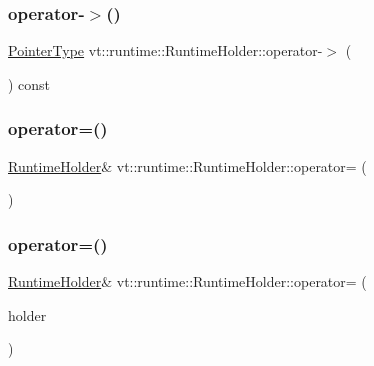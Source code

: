 \subsubsection{\texorpdfstring{operator-\/$>$()}{operator->()}}
{\footnotesize\ttfamily \hyperlink{structvt_1_1runtime_1_1_runtime_holder_a9740e8aa7487fcf38b67a7e160d7b046}{Pointer\+Type} vt\+::runtime\+::\+Runtime\+Holder\+::operator-\/$>$ (\begin{DoxyParamCaption}{ }\end{DoxyParamCaption}) const\hspace{0.3cm}{\ttfamily [inline]}}

\mbox{\label{structvt_1_1runtime_1_1_runtime_holder_a07fbb75fca325419cea85801f7208f22}} 
\subsubsection{\texorpdfstring{operator=()}{operator=()}\hspace{0.1cm}{\footnotesize\ttfamily [1/2]}}
{\footnotesize\ttfamily \hyperlink{structvt_1_1runtime_1_1_runtime_holder}{Runtime\+Holder}\& vt\+::runtime\+::\+Runtime\+Holder\+::operator= (\begin{DoxyParamCaption}\item[{std\+::nullptr\+\_\+t}]{ }\end{DoxyParamCaption})\hspace{0.3cm}{\ttfamily [inline]}}

\mbox{\label{structvt_1_1runtime_1_1_runtime_holder_a77b0ac53097a24b419cdd33193627b11}} 
\subsubsection{\texorpdfstring{operator=()}{operator=()}\hspace{0.1cm}{\footnotesize\ttfamily [2/2]}}
{\footnotesize\ttfamily \hyperlink{structvt_1_1runtime_1_1_runtime_holder}{Runtime\+Holder}\& vt\+::runtime\+::\+Runtime\+Holder\+::operator= (\begin{DoxyParamCaption}\item[{\hyperlink{structvt_1_1runtime_1_1_runtime_holder}{Runtime\+Holder} \&\&}]{holder }\end{DoxyParamCaption})\hspace{0.3cm}{\ttfamily [inline]}}

